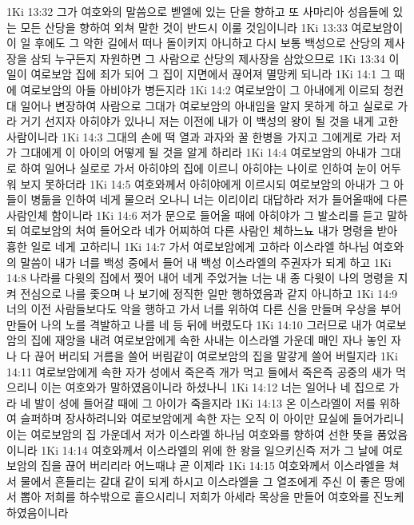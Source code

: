 1Ki 13:32  그가 여호와의 말씀으로 벧엘에 있는 단을 향하고 또 사마리아 성읍들에 있는 모든 산당을 향하여 외쳐 말한 것이 반드시 이룰 것임이니라
1Ki 13:33  여로보암이 이 일 후에도 그 악한 길에서 떠나 돌이키지 아니하고 다시 보통 백성으로 산당의 제사장을 삼되 누구든지 자원하면 그 사람으로 산당의 제사장을 삼았으므로
1Ki 13:34  이 일이 여로보암 집에 죄가 되어 그 집이 지면에서 끊어져 멸망케 되니라
1Ki 14:1  그 때에 여로보암의 아들 아비야가 병든지라
1Ki 14:2  여로보암이 그 아내에게 이르되 청컨대 일어나 변장하여 사람으로 그대가 여로보암의 아내임을 알지 못하게 하고 실로로 가라 거기 선지자 아히야가 있나니 저는 이전에 내가 이 백성의 왕이 될 것을 내게 고한 사람이니라
1Ki 14:3  그대의 손에 떡 열과 과자와 꿀 한병을 가지고 그에게로 가라 저가 그대에게 이 아이의 어떻게 될 것을 알게 하리라
1Ki 14:4  여로보암의 아내가 그대로 하여 일어나 실로로 가서 아히야의 집에 이르니 아히야는 나이로 인하여 눈이 어두워 보지 못하더라
1Ki 14:5  여호와께서 아히야에게 이르시되 여로보암의 아내가 그 아들이 병듦을 인하여 네게 물으러 오나니 너는 이리이리 대답하라 저가 들어올때에 다른 사람인체 함이니라
1Ki 14:6  저가 문으로 들어올 때에 아히야가 그 발소리를 듣고 말하되 여로보암의 처여 들어오라 네가 어찌하여 다른 사람인 체하느뇨 내가 명령을 받아 흉한 일로 네게 고하리니
1Ki 14:7  가서 여로보암에게 고하라 이스라엘 하나님 여호와의 말씀이 내가 너를 백성 중에서 들어 내 백성 이스라엘의 주권자가 되게 하고
1Ki 14:8  나라를 다윗의 집에서 찢어 내어 네게 주었거늘 너는 내 종 다윗이 나의 명령을 지켜 전심으로 나를 좇으며 나 보기에 정직한 일만 행하였음과 같지 아니하고
1Ki 14:9  너의 이전 사람들보다도 악을 행하고 가서 너를 위하여 다른 신을 만들며 우상을 부어 만들어 나의 노를 격발하고 나를 네 등 뒤에 버렸도다
1Ki 14:10  그러므로 내가 여로보암의 집에 재앙을 내려 여로보암에게 속한 사내는 이스라엘 가운데 매인 자나 놓인 자나 다 끊어 버리되 거름을 쓸어 버림같이 여로보암의 집을 말갛게 쓸어 버릴지라
1Ki 14:11  여로보암에게 속한 자가 성에서 죽은즉 개가 먹고 들에서 죽은즉 공중의 새가 먹으리니 이는 여호와가 말하였음이니라 하셨나니
1Ki 14:12  너는 일어나 네 집으로 가라 네 발이 성에 들어갈 때에 그 아이가 죽을지라
1Ki 14:13  온 이스라엘이 저를 위하여 슬퍼하며 장사하려니와 여로보암에게 속한 자는 오직 이 아이만 묘실에 들어가리니 이는 여로보암의 집 가운데서 저가 이스라엘 하나님 여호와를 향하여 선한 뜻을 품었음이니라
1Ki 14:14  여호와께서 이스라엘의 위에 한 왕을 일으키신즉 저가 그 날에 여로보암의 집을 끊어 버리리라 어느때냐 곧 이제라
1Ki 14:15  여호와께서 이스라엘을 쳐서 물에서 흔들리는 갈대 같이 되게 하시고 이스라엘을 그 열조에게 주신 이 좋은 땅에서 뽑아 저희를 하수밖으로 흩으시리니 저희가 아세라 목상을 만들어 여호와를 진노케 하였음이니라
